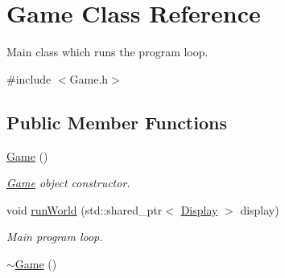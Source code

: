 \hypertarget{classGame}{\section{Game Class Reference}
\label{classGame}
}


Main class which runs the program loop.  




{\ttfamily \#include $<$Game.\-h$>$}

\subsection*{Public Member Functions}
\begin{DoxyCompactItemize}
\item 
\hyperlink{classGame_ad59df6562a58a614fda24622d3715b65}{Game} ()
\begin{DoxyCompactList}\small\item\em \hyperlink{classGame}{Game} object constructor. \end{DoxyCompactList}\item 
void \hyperlink{classGame_a6073fbea287e3bd28ae5eaf350559448}{run\-World} (std\-::shared\-\_\-ptr$<$ \hyperlink{classDisplay}{Display} $>$ display)
\begin{DoxyCompactList}\small\item\em Main program loop. \end{DoxyCompactList}\item 
\hyperlink{classGame_ae3d112ca6e0e55150d2fdbc704474530}{$\sim$\-Game} ()
\end{DoxyCompactItemize}
